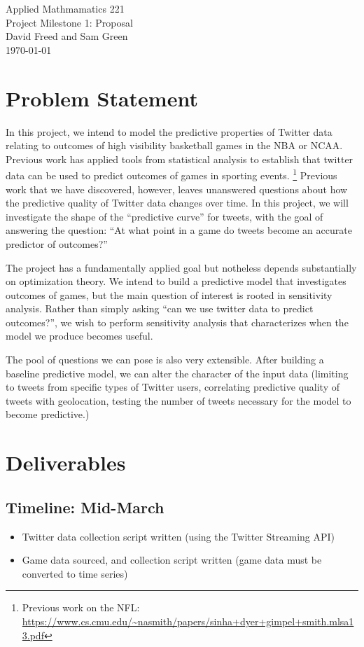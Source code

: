 \documentclass[12pt]{article}
\begin{document}
\begin{center}
{\Large Applied Mathmamatics 221}\\
Project Milestone 1: Proposal\\
David Freed and Sam Green\\
\today
\end{center}

\section{Problem Statement}

In this project, we intend to model the predictive 
properties of Twitter data relating to outcomes
of high visibility basketball games in the NBA
or NCAA. Previous work has applied tools from 
statistical analysis to establish that
twitter data can be used to predict outcomes
of games in sporting events. \footnote{Previous work on the NFL: \url{https://www.cs.cmu.edu/~nasmith/papers/sinha+dyer+gimpel+smith.mlsa13.pdf}} Previous work that we have discovered,
however, leaves unanswered questions about how the predictive quality
of Twitter data changes over time. In this project, we will investigate
the shape of the ``predictive curve'' for tweets, with the goal of answering
the question: ``At what point in a game do tweets become an accurate predictor of outcomes?''

The project has a fundamentally applied goal but notheless depends substantially
on optimization theory. We intend to build a predictive model that investigates
outcomes of games, but the main question of interest is rooted in sensitivity
analysis. Rather than simply asking ``can we use twitter data to predict outcomes?'',
we wish to perform sensitivity analysis that characterizes when the model 
we produce becomes useful. 

The pool of questions we can pose is also very extensible. After building 
a baseline predictive model, we can alter the character of the input data
(limiting to tweets from specific types of Twitter users, correlating predictive
quality of tweets with geolocation, testing the number of tweets necessary 
for the model to become predictive.) 

\section{Deliverables}

\subsection{Timeline: Mid-March}  
\begin{itemize}
\item Twitter data collection script written (using the Twitter Streaming API)
\item Game data sourced, and collection script written (game data must be converted to time series)
\end{itemize} 
\end{document}
